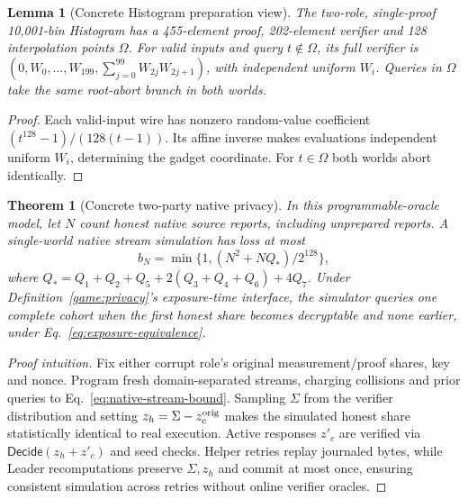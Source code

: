 \documentclass[conference,compsoc]{IEEEtran}
\theoremstyle{definition}
\numberwithin{equation}{section}
\numberwithin{table}{section}
\numberwithin{figure}{section}
\theoremstyle{plain}
\newtheorem{theorem}{Theorem}[section]
\newtheorem{lemma}{Lemma}[section]
\newtheorem{theorem}{Theorem}
\newtheorem{lemma}{Lemma}
\begin{document}
\begin{lemma}[Concrete Histogram preparation view]
\label{lem:concrete-histogram-view}
The two-role, single-proof 10,001-bin Histogram has a 455-element proof,
202-element verifier and 128 interpolation points \(\Omega\).
For valid inputs and query \(t\notin\Omega\), its full verifier is
\((0,W_0,\ldots,W_{199},\sum_{j=0}^{99}W_{2j}W_{2j+1})\), with
independent uniform \(W_i\). Queries in \(\Omega\) take the same root-abort
branch in both worlds.
\end{lemma}
\begin{proof}
Each valid-input wire has nonzero random-value coefficient
\((t^{128}-1)/(128(t-1))\). Its affine inverse makes evaluations
independent uniform \(W_i\), determining the gadget coordinate.
For \(t\in\Omega\) both worlds abort identically.
\end{proof}



\begin{theorem}[Concrete two-party native privacy]
\label{thm:concrete-two-party-native}
In this programmable-oracle model, let \(N\) count honest native source
reports, including unprepared reports.
A single-world native stream simulation has loss at most
\begin{equation}
 b_N=\min\{1,(N^2+NQ_*)/2^{128}\},
 \label{eq:native-stream-bound}
\end{equation}
where \(Q_*=Q_1+Q_2+Q_5+2(Q_3+Q_4+Q_6)+4Q_7\).
Under Definition~\ref{game:privacy}'s exposure-time interface, the simulator
queries one complete cohort when the first honest share becomes
decryptable and none earlier, under Eq.~\eqref{eq:exposure-equivalence}.
\end{theorem}
\begin{proof}[Proof intuition]
Fix either corrupt role's original measurement/proof shares, key and nonce.
Program fresh domain-separated streams, charging collisions and prior queries
to Eq.~\eqref{eq:native-stream-bound}. Sampling \(\Sigma\) from the verifier distribution
and setting \(z_h=\Sigma-z_c^{\rm orig}\) makes the simulated honest share statistically identical
to real execution. Active responses \(z'_c\) are verified via \(\mathsf{Decide}(z_h+z'_c)\)
and seed checks. Helper retries replay journaled bytes, while Leader
recomputations preserve \(\Sigma,z_h\) and commit at most once, ensuring
consistent simulation across retries without online verifier oracles.
\end{proof}
\end{document}
